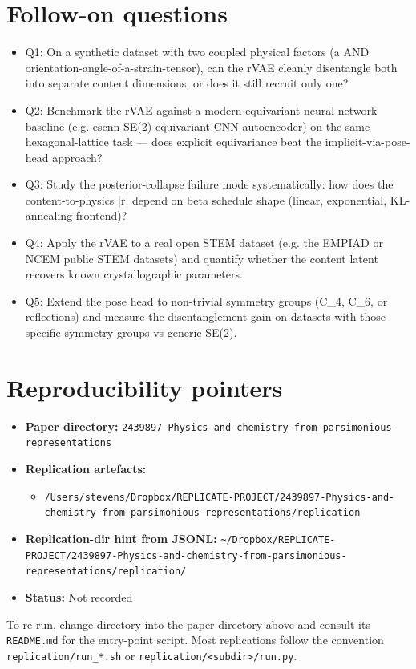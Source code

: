 \documentclass[11pt]{article}
\begin{document}
\section{Follow-on questions}
\begin{itemize}
\item Q1: On a synthetic dataset with two coupled physical factors (a AND orientation-angle-of-a-strain-tensor), can the rVAE cleanly disentangle both into separate content dimensions, or does it still recruit only one?
\item Q2: Benchmark the rVAE against a modern equivariant neural-network baseline (e.g. escnn SE(2)-equivariant CNN autoencoder) on the same hexagonal-lattice task — does explicit equivariance beat the implicit-via-pose-head approach?
\item Q3: Study the posterior-collapse failure mode systematically: how does the content-to-physics |r| depend on beta schedule shape (linear, exponential, KL-annealing frontend)?
\item Q4: Apply the rVAE to a real open STEM dataset (e.g. the EMPIAD or NCEM public STEM datasets) and quantify whether the content latent recovers known crystallographic parameters.
\item Q5: Extend the pose head to non-trivial symmetry groups (C\_4, C\_6, or reflections) and measure the disentanglement gain on datasets with those specific symmetry groups vs generic SE(2).
\end{itemize}

\section{Reproducibility pointers}\label{sec:repro}
\begin{itemize}
\item \textbf{Paper directory:} \texttt{2439897-Physics-and-chemistry-from-parsimonious-representations}
\item \textbf{Replication artefacts:}
\begin{itemize}
\item \texttt{/Users/stevens/Dropbox/REPLICATE-PROJECT/2439897-Physics-and-chemistry-from-parsimonious-representations/replication}
\end{itemize}
\item \textbf{Replication-dir hint from JSONL:} \texttt{\textasciitilde{}/Dropbox/REPLICATE-PROJECT/2439897-Physics-and-chemistry-from-parsimonious-representations/replication/}
\item \textbf{Status:} Not recorded
\end{itemize}

To re-run, change directory into the paper directory above and consult its \texttt{README.md} for the entry-point script. Most replications follow the convention \texttt{replication/run\_*.sh} or \texttt{replication/<subdir>/run.py}.
\end{document}

